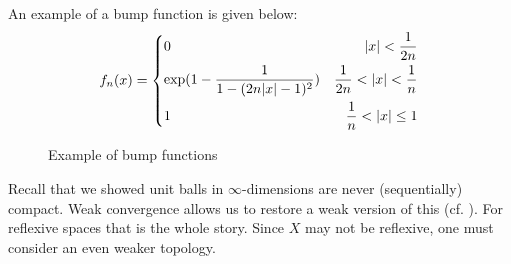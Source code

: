 \documentclass{article}
\begin{document}
\begin{unexaminable}
%   
An example of a bump function is given below:
\begin{equation}
f_n(x)=
\left\{
\begin{aligned}
&0 &|x|<\frac{1}{2n}\\
&{\rm exp}(1-\frac{1}{1-(2n|x|-1)^2}) &\frac{1}{2n}<|x|<\frac{1}{n}\\
&1 &\frac{1}{n}<|x|\leq1\\
\end{aligned}
\right.
\end{equation}


\begin{figure}[H]
  \centering
  \caption{Example of bump functions}
\end{figure} 



\end{unexaminable}

Recall that we showed unit balls in $\infty$-dimensions are never (sequentially) compact. Weak convergence allows us to restore a weak version of this (cf. \todo{}). For reflexive spaces that is the whole story.  Since $X$ may not be reflexive, one must consider an even weaker topology.  
\end{document}
